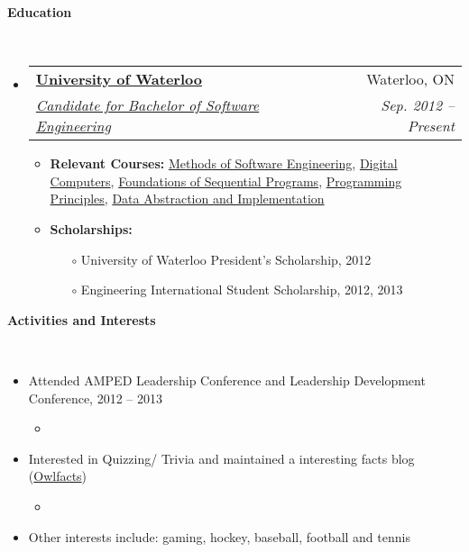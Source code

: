 \documentclass[letterpaper,11pt]{article}
\makeatletter
\newcommand{\resitem}[1]{\item #1 \vspace{-2pt}}
\newcommand{\resheading}[1]{{\large \colorbox{mygrey}{\begin{minipage}{\textwidth}{\textbf{#1 \vphantom{p\^{E}}}}\end{minipage}}}}
\newcommand{\ressubheading}[4]{
\begin{tabular*}{6.5in}{l@{\extracolsep{\fill}}r}
		\textbf{#1} & #2 \\
		\textit{#3} & \textit{#4} \\
\end{tabular*}\vspace{-6pt}}
\makeatother
\begin{document}
\resheading{Education}
	\\[16pt]
	\begin{itemize}	\itemsep 3pt
		\item
			\ressubheading{\href{http://www.uwaterloo.ca}{ \color {black} University of Waterloo}}{Waterloo, ON}{\href{https://uwaterloo.ca/software-engineering/}{ \color {black} Candidate for Bachelor of Software Engineering}} {Sep. 2012 -- Present}
				{ \normalsize
				\begin{itemize} \itemsep 3pt
					
					\resitem{\textbf{Relevant Courses:}} \href{http://www.ucalendar.uwaterloo.ca/1213/COURSE/course-SE.html#SE101}{\small  \color {black} Methods of Software Engineering},  \href{http://www.ucalendar.uwaterloo.ca/1213/COURSE/course-ECE.html#ECE222}{\small  \color {black} Digital Computers}, \href{http://www.ucalendar.uwaterloo.ca/1213/COURSE/course-CS.html#CS241}{\small  \color {black} Foundations of Sequential Programs}, \href{http://www.ucalendar.uwaterloo.ca/1213/COURSE/course-CS.html#CS137}{\small  \color {black} Programming Principles}, \href{http://www.ucalendar.uwaterloo.ca/1213/COURSE/course-CS.html#CS138}{ \vspace{1 mm}\small   \color {black}  Data Abstraction and Implementation}
					
				\resitem{\textbf{Scholarships:}}
					\begin{itemize}\itemsep 3pt
						\item[$\circ$]{University of Waterloo President's Scholarship, 2012}
						\item[$\circ$]{Engineering International Student Scholarship, 2012, 2013}
					\end{itemize}
\end{itemize}}
			
	\end{itemize} %

\resheading{Activities and Interests}
	{
	\\[16pt]
	\normalsize
	\begin{itemize} \itemsep -7pt
		\item Attended AMPED Leadership Conference and Leadership Development Conference, 2012 -- 2013
			\begin{itemize}
			\item \vspace{-3 mm}{Improved leadership traits and ethical knowledge}
			\end{itemize}
		\item Interested in Quizzing/ Trivia and maintained a interesting facts blog (\href{theowlfacts.blogspot.ca}{Owlfacts})
			\begin{itemize} 
			\item \vspace{-3 mm}{Regularly updated, informative random facts; received 300 unique visits a month}
			\end{itemize}
		\item Other interests include: gaming, hockey, baseball, football and tennis 
\end{itemize}
}
\end{document}
